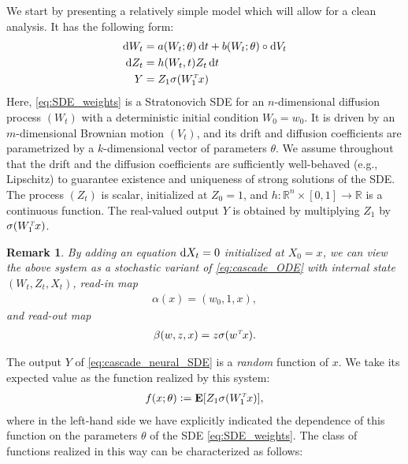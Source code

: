 \documentclass[letterpaper, 10pt, conference]{ieeeconf}
\def\Reals{{\mathbb R}}
\def\Ex{{\mathbf E}} %
\def\trn{{\hbox{\it\tiny T}}} %
\def\deq{:=}
\newtheorem{remark}{Remark}
\begin{document}
We start by presenting a relatively simple model which will allow for a clean analysis. It has the following form:
\begin{subequations}\label{eq:cascade_neural_SDE}
\begin{align}
	\dif W_t&= a(W_t;\theta) \dif t + b(W_t;\theta) \circ \dif V_t \label{eq:SDE_weights}\\
	\dif Z_t &= h(W_t,t)Z_t \dif t \label{eq:SDE_FK}\\
	 Y &= Z_1 \sigma(W_1^\trn x) \label{eq:SDE_readout}
\end{align}
\end{subequations}
Here, \eqref{eq:SDE_weights} is a Stratonovich SDE for an $n$-dimensional diffusion process $(W_t)$ with a deterministic initial condition $W_0 = w_0$.  It is driven by an $m$-dimensional Brownian motion $(V_t)$, and its drift and diffusion coefficients are parametrized by a $k$-dimensional vector of parameters $\theta$. We assume throughout that the drift and the diffusion coefficients are sufficiently well-behaved (e.g., Lipschitz) to guarantee existence and uniqueness of strong solutions of the SDE. The process $(Z_t)$ is scalar, initialized at $Z_0 = 1$, and $h : \Reals^n \times [0,1] \to \Reals$ is a continuous function. The real-valued output $Y$ is obtained by multiplying $Z_1$ by $\sigma(W_1^\trn x)$.

\begin{remark} {\em By adding an equation $\dif X_t = 0$ initialized at $X_0 = x$, we can view the above system as a stochastic variant of \eqref{eq:cascade_ODE} with internal state $(W_t,Z_t,X_t)$, read-in map
	\begin{align*}\alpha(x) = (w_0,1,x),
	\end{align*}
	and read-out map
	\begin{align*}\beta(w,z,x) = z\sigma(w^\trn x).
	\end{align*}}
\end{remark}

The output $Y$ of \eqref{eq:cascade_neural_SDE} is a \textit{random} function of $x$. We take its expected value as the function realized by this system:
\begin{align}\label{eq:f_theta}
	f(x;\theta) \deq \Ex[Z_1\sigma(W^\trn_1x)],
\end{align}
where in the left-hand side we have explicitly indicated the dependence of this function on the parameters $\theta$ of the SDE \eqref{eq:SDE_weights}. The class of functions realized in this way can be characterized as follows:
\end{document}
